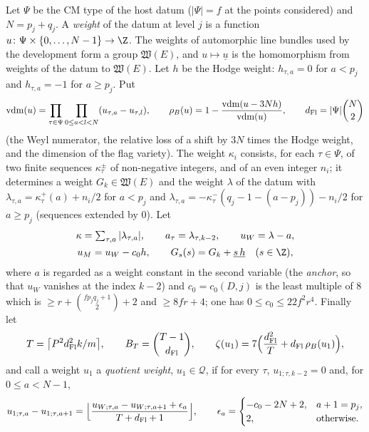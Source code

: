 \begin{definition}[Weights]\label{pf:lift2:def:wt}
Let $\Psi$ be the CM type of the host datum ($|\Psi|=f$ at the points considered) and $N=p_j+q_j$. A \emph{weight}
of the datum at level $j$ is a function $u\colon\Psi\times\{0,\dots,N-1\}\to\Z$. The weights of automorphic line
bundles used by the development form a group $\mathfrak W(E)$, and $u\mapsto\underline u$ is the homomorphism from
weights of the datum to $\mathfrak W(E)$. Let $h$ be the Hodge weight: $h_{\tau,a}=0$ for $a<p_j$ and $h_{\tau,a}=-1$
for $a\ge p_j$. Put
\[
\operatorname{vdm}(u)=\prod_{\tau\in\Psi}\prod_{0\le a<l<N}(u_{\tau,a}-u_{\tau,l}),\qquad
\rho_B(u)=1-\frac{\operatorname{vdm}(u-3Nh)}{\operatorname{vdm}(u)},\qquad d_{\mathrm{Fl}}=|\Psi|\binom N2
\]
(the Weyl numerator, the relative loss of a shift by $3N$ times the Hodge weight, and the dimension of the flag
variety). The weight $\kappa_i$ consists, for each $\tau\in\Psi$, of two finite sequences $\kappa^{\pm}_\tau$ of
non-negative integers, and of an even integer $n_i$; it determines a weight $G_k\in\mathfrak W(E)$ and the weight
$\lambda$ of the datum with $\lambda_{\tau,a}=\kappa^+_\tau(a)+n_i/2$ for $a<p_j$ and
$\lambda_{\tau,a}=-\kappa^-_\tau(q_j-1-(a-p_j))-n_i/2$ for $a\ge p_j$ (sequences extended by $0$). Let
\begin{gather*}
\kappa=\textstyle\sum_{\tau,a}|\lambda_{\tau,a}|,\qquad a_\tau=\lambda_{\tau,k-2},\qquad u_W=\lambda-a,\\
u_M=u_W-c_0h,\qquad G_s(s)=G_k+\underline{s\,h}\quad(s\in\Z),
\end{gather*}
where $a$ is regarded as a weight constant in the second variable (the \emph{anchor}, so that $u_W$ vanishes at the
index $k-2$) and $c_0=c_0(D,j)$ is the least multiple of $8$ which is $\ge r+\binom{fp_jq_j+1}2+2$ and $\ge8fr+4$;
one has $0\le c_0\le22f^2r^4$. Finally let
\[
T=\bigl\lceil P^2d_{\mathrm{Fl}}^2k/m\bigr\rceil,\qquad B_T=\binom{T-1}{d_{\mathrm{Fl}}},\qquad
\zeta(u_1)=7\Bigl(\frac{d_{\mathrm{Fl}}^2}{T}+d_{\mathrm{Fl}}\,\rho_B(u_1)\Bigr),
\]
and call a weight $u_1$ a \emph{quotient weight}, $u_1\in\mathcal Q$, if for every $\tau$, $u_{1;\tau,k-2}=0$ and, for $0\le a<N-1$,
\[
u_{1;\tau,a}-u_{1;\tau,a+1}=\Bigl\lfloor\frac{u_{W;\tau,a}-u_{W;\tau,a+1}+\epsilon_a}{T+d_{\mathrm{Fl}}+1}\Bigr\rfloor,\qquad
\epsilon_a=\begin{cases}-c_0-2N+2,&a+1=p_j,\\ 2,&\text{otherwise}.\end{cases}
\]
\end{definition}

